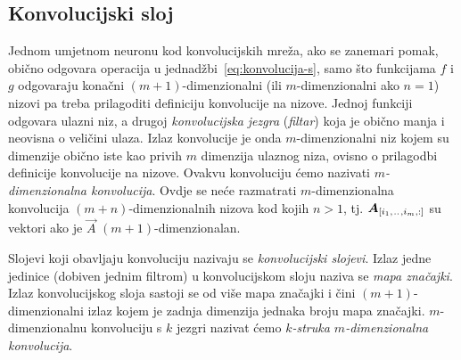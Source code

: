 \documentclass[utf8, diplomski, lmodern]{fer}
\begin{document}
\subsection{Konvolucijski sloj}

Jednom umjetnom neuronu kod konvolucijskih mreža, ako se zanemari pomak, obično odgovara operacija u jednadžbi~\eqref{eq:konvolucija-s}, samo što funkcijama $f$ i $g$ odgovaraju konačni $(m+1)$-dimenzionalni (ili $m$-dimenzionalni ako $n=1$) nizovi pa treba prilagoditi definiciju konvolucije na nizove. Jednoj funkciji odgovara ulazni niz, a drugoj \emph{konvolucijska jezgra} (\emph{filtar}) koja je obično manja i neovisna o veličini ulaza. Izlaz konvolucije je onda $m$-dimenzionalni niz kojem su dimenzije obično iste kao privih $m$ dimenzija ulaznog niza, ovisno o prilagodbi definicije konvolucije na nizove. Ovakvu konvoluciju ćemo nazivati \emph{$m$-dimenzionalna konvolucija}. Ovdje se neće razmatrati $m$-dimenzionalna konvolucija $(m+n)$-dimenzionalnih nizova kod kojih $n>1$, tj. $\vec A_\ind{i_1,\bidot,i_m,:}$ su vektori ako je $\vec A$ $(m+1)$-dimenzionalan.

Slojevi koji obavljaju konvoluciju nazivaju se \emph{konvolucijski slojevi}. Izlaz jedne jedinice (dobiven jednim filtrom) u konvolucijskom sloju naziva se \emph{mapa značajki}. Izlaz konvolucijskog sloja sastoji se od više mapa značajki i čini $(m+1)$-dimenzionalni izlaz kojem je zadnja dimenzija jednaka broju mapa značajki. $m$-dimenzionalnu konvoluciju s $k$ jezgri nazivat ćemo \emph{$k$-struka $m$-dimenzionalna konvolucija}.
\end{document}
